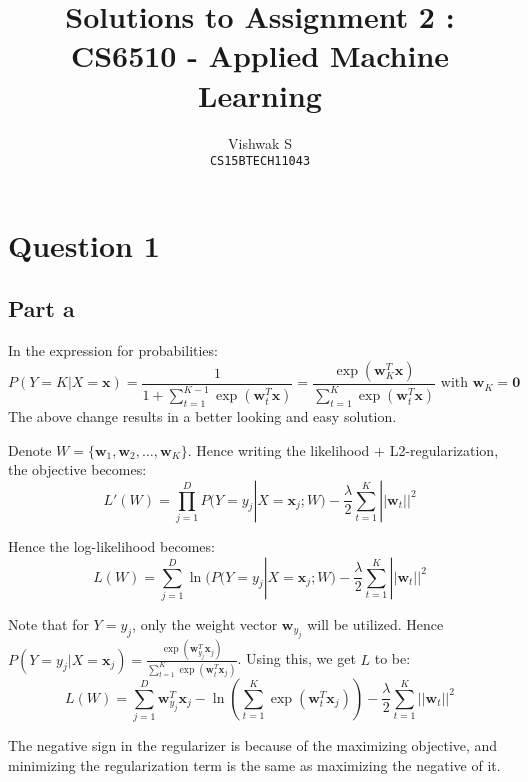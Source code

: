 \documentclass{article}
\title{Solutions to Assignment 2 : CS6510 - Applied Machine Learning}
\author{Vishwak S\\
\texttt{CS15BTECH11043}}
\date{}
\newcommand{\xbold}{\mathbf{x}}
\newcommand{\wbold}{\mathbf{w}}
\begin{document}
\maketitle

\section*{Question 1}
\subsection*{Part a}
\begin{flushleft}
In the expression for probabilities:
\begin{equation}
P(Y = K | X = \xbold) = \frac{1}{1 + \displaystyle \sum_{t=1}^{K-1} \exp(\wbold_{t}^{T}\xbold)} = \frac{\exp(\wbold_{K}^{T}\xbold)}{\displaystyle \sum_{t=1}^{K} \exp(\wbold_{t}^{T}\xbold)} \text{ with } \wbold_{K} = \mathbf{0}
\end{equation}
The above change results in a better looking and easy solution.

Denote \(W = \{\wbold_{1}, \wbold_{2}, \ldots, \wbold_{K}\}\). Hence writing the likelihood \(+\) L2-regularization, the objective becomes:
\begin{equation}
L'(W) = \displaystyle \prod_{j=1}^{D}P(Y = y_{j} | X = \xbold_{j} ; W) - \frac{\lambda}{2}\sum_{t=1}^{K}||\wbold_{t}||^{2}
\end{equation}

Hence the log-likelihood becomes:
\begin{equation}
L(W) = \displaystyle \sum_{j=1}^{D} \ln(P(Y = y_{j} | X = \xbold_{j} ; W) - \frac{\lambda}{2}\sum_{t=1}^{K}||\wbold_{t}||^{2}
\end{equation}

Note that for \(Y = y_{j}\), only the weight vector \(\wbold_{y_{j}}\) will be utilized. Hence \(P(Y = y_{j} | X = \xbold_{j}) = \displaystyle \frac{\exp(\wbold_{y_{j}}^{T}\xbold_{j})}{\displaystyle \sum_{t=1}^{K} \exp(\wbold_{t}^{T}\xbold_{j})}\). Using this, we get \(L\) to be:
\begin{equation}
L(W) = \displaystyle \sum_{j=1}^{D} \wbold_{y_{j}}^{T}\xbold_{j} - \ln\left(\sum_{t=1}^{K}\exp(\wbold_{t}^{T}\xbold_{j})\right) - \frac{\lambda}{2}\sum_{t=1}^{K} ||\wbold_{t}||^{2}
\end{equation}

The negative sign in the regularizer is because of the maximizing objective, and minimizing the regularization term is the same as maximizing the negative of it.
\end{flushleft}
\end{document}
